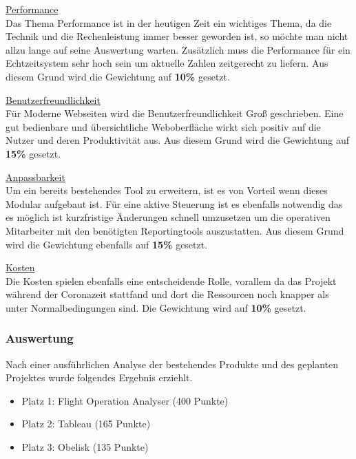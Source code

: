 		\vspace{8pt}

		{
			\noindent
			\underline{Performance}\\
			Das Thema Performance ist in der heutigen Zeit ein wichtiges Thema, da die Technik und die Rechenleistung immer besser geworden ist, so möchte man nicht allzu lange auf seine Auswertung warten. Zusätzlich muss die Performance für ein Echtzeitsystem sehr hoch sein um aktuelle Zahlen zeitgerecht zu liefern. Aus diesem Grund wird die Gewichtung auf \textbf{10\%} gesetzt.
		}

		\vspace{8pt}

		{
			\noindent
			\underline{Benutzerfreundlichkeit}\\
			Für Moderne Webseiten wird die Benutzerfreundlichkeit Groß geschrieben. Eine gut bedienbare und übersichtliche Weboberfläche wirkt sich positiv auf die Nutzer und deren Produktivität aus. Aus diesem Grund wird die Gewichtung auf \textbf{15\%} gesetzt.
		}

		\vspace{8pt}

		{
			\noindent
			\underline{Anpassbarkeit}\\
			Um ein bereits bestehendes Tool zu erweitern, ist es von Vorteil wenn dieses Modular aufgebaut ist. Für eine aktive Steuerung ist es ebenfalls notwendig das es möglich ist kurzfristige Änderungen schnell umzusetzen um die operativen Mitarbeiter mit den benötigten Reportingtools auszustatten. Aus diesem Grund wird die Gewichtung ebenfalls auf \textbf{15\%} gesetzt.
		}

		\vspace{8pt}

		{
			\noindent
			\underline{Kosten}\\
			Die Kosten spielen ebenfalls eine entscheidende Rolle, vorallem da das Projekt während der Coronazeit stattfand und dort die Ressourcen noch knapper als unter Normalbedingungen sind. Die Gewichtung wird auf \textbf{10\%} gesetzt.
		}

		\subsubsection{Auswertung}
		Nach einer ausführlichen Analyse der bestehendes Produkte und des geplanten Projektes wurde folgendes Ergebnis erziehlt.

		\begin{itemize}
			\item Platz 1: Flight Operation Analyser (400 Punkte)
			\item Platz 2: Tableau (165 Punkte)
			\item Platz 3: Obelisk (135 Punkte)
		\end{itemize}

